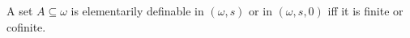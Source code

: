 A set $A \subseteq \omega$ is elementarily definable in $(\omega, s)$ or in $(\omega, s, 0)$ iff it is finite or cofinite.
